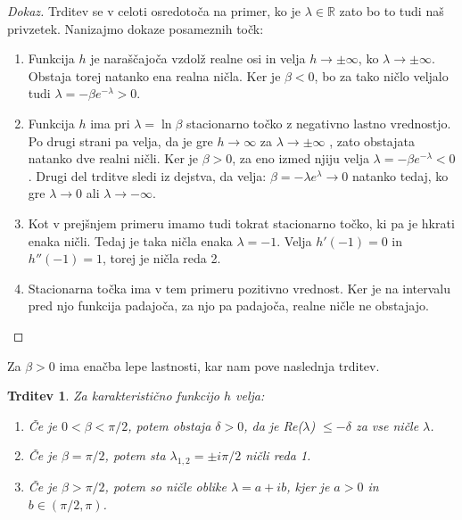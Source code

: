 \documentclass[12pt,a4paper]{amsart}
\theoremstyle{definition} %
\theoremstyle{plain} %
\newtheorem{trditev}[definicija]{Trditev}
\newcommand{\R}{\mathbb R}
\begin{document}
\begin{proof}[Dokaz]
    Trditev se v celoti osredotoča na primer, ko je $\lambda\in\R$ zato bo to tudi naš privzetek.
    Nanizajmo dokaze posameznih točk:
    \begin{enumerate}
        \item Funkcija $h$ je naraščajoča vzdolž realne osi in velja $h \to \pm \infty$, ko $\lambda \to \pm \infty$. Obstaja 
        torej natanko ena realna ničla. Ker je $\beta < 0$, bo za tako ničlo veljalo tudi $\lambda = -\beta e^{-\lambda} >0$.
        \item Funkcija $h$ ima pri $\lambda=\ln\beta$ stacionarno točko z negativno lastno vrednostjo. Po drugi strani pa velja, da je gre $h\to\infty$ za $\lambda\to\pm\infty$
        , zato obstajata natanko dve realni ničli. Ker je 
        $\beta > 0$, za eno izmed njiju velja $\lambda = -\beta e^{-\lambda} <0$. Drugi del trditve sledi iz dejstva, da velja:
        $ \beta = -\lambda e^{\lambda} \to 0$ natanko tedaj, ko gre $\lambda \to 0$ ali $\lambda \to -\infty$.
        \item Kot v prejšnjem primeru imamo tudi tokrat stacionarno točko, ki pa je hkrati enaka ničli. 
        Tedaj je taka ničla enaka $\lambda = -1$. Velja $h'(-1)=0$ in $h''(-1)=1$, torej
        je ničla reda 2.
        \item Stacionarna točka ima v tem primeru pozitivno vrednost. Ker je na intervalu pred njo funkcija padajoča,
         za njo pa padajoča, realne ničle ne obstajajo. 
    \end{enumerate}
\end{proof}

Za $\beta > 0$ ima enačba lepe lastnosti, kar nam pove naslednja trditev.

\begin{trditev}
    Za karakteristično funkcijo $h$ velja:
    \begin{enumerate}
        \item Če je $0<\beta < \pi /2$, potem obstaja $\delta > 0$, da je Re($\lambda$) $\leq -\delta$
        za vse ničle $\lambda$.
        \item Če je $\beta = \pi /2$, potem sta $\lambda_{1,2}=\pm i\pi /2$ ničli reda 1.
        \item Če je $\beta > \pi /2$, potem so ničle oblike $\lambda = a + ib$, kjer je $a>0$ in 
         $b \in (\pi /2, \pi)$.
    \end{enumerate} 
\end{trditev}
\end{document}
